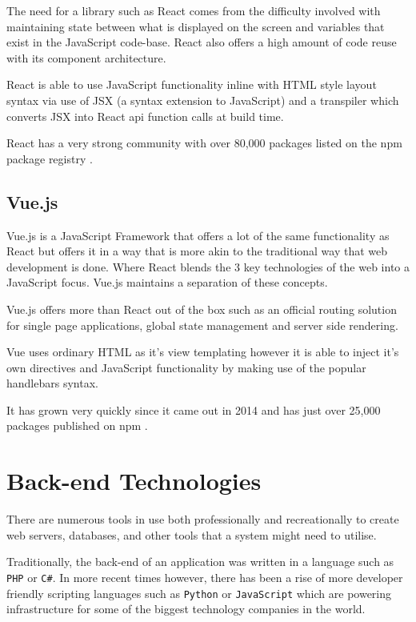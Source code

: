 The need for a library such as React comes from the difficulty involved with maintaining state between what is displayed on the screen and variables that exist in the JavaScript code-base. React also offers a high amount of code reuse with its component architecture. 

React is able to use JavaScript functionality inline with HTML style layout syntax via use of JSX (a syntax extension to JavaScript) and a transpiler which converts JSX into React api function calls at build time.

React has a very strong community with over 80,000 packages listed on the npm package registry \cite{npm-search-react}.

\subsection{Vue.js}

Vue.js is a JavaScript Framework that offers a lot of the same functionality as React but offers it in a way that is more akin to the traditional way that web development is done. Where React blends the 3 key technologies of the web into a JavaScript focus. Vue.js maintains a separation of these concepts.

Vue.js offers more than React out of the box such as an official routing solution for single page applications, global state management and server side rendering.

Vue uses ordinary HTML as it's view templating however it is able to inject it's own directives and JavaScript functionality by making use of the popular handlebars syntax.

It has grown very quickly since it came out in 2014 and has just over 25,000 packages published on npm \cite{npm-search-vue}.

\section{Back-end Technologies} \label{lit-back-end}

There are numerous tools in use both professionally and recreationally to create web servers, databases, and other tools that a system might need to utilise. 

Traditionally, the back-end of an application was written in a language such as \texttt{PHP} or \texttt{C\#}. In more recent times however, there has been a rise of more developer friendly scripting languages such as \texttt{Python} or \texttt{JavaScript} which are powering infrastructure for some of the biggest technology companies in the world.


